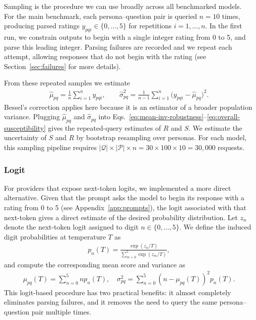 \documentclass{article}
\begin{document}
Sampling is the procedure we can use broadly across all benchmarked models. For the main benchmark, each persona--question pair is queried \(n=10\) times, producing parsed ratings \(y_{pqi}\in\{0,\ldots,5\}\) for repetitions \(i=1,\ldots,n\). In the first run, we constrain outputs to begin with a single integer rating from 0 to 5, and parse this leading integer. Parsing failures are recorded and we repeat each attempt, allowing responses that do not begin with the rating (see Section~\ref{sec:failures} for more details).

From these repeated samples we estimate
\begin{align}
  \hat{\mu}_{pq} = \frac{1}{n} \sum_{i=1}^{n} y_{pqi},\qquad \hat{\sigma}_{pq}^2 = \frac{1}{n-1} \sum_{i=1}^{n} \big(y_{pqi} - \hat{\mu}_{pq}\big)^2.
\end{align}
Bessel's correction applies here because it is an estimator of a broader population variance. Plugging \(\hat{\mu}_{pq}\) and \(\hat{\sigma}_{pq}\) into Eqs.~\eqref{eq:mean-inv-robustness}--\eqref{eq:overall-susceptibility} gives the repeated-query estimates of \(R\) and \(S\). We estimate the uncertainty of \(S\) and \(R\) by bootstrap resampling over personas. For each model, this sampling pipeline requires $|\mathcal{Q}|\times|\mathcal{P}|\times n =30\times 100\times 10=30,000$ requests.

\subsubsection{Logit}
\label{sec:logit}

For providers that expose next-token logits, we implemented a more direct alternative. Given that the prompt asks the model to begin its response with a rating from 0 to 5 (see Appendix~\ref{app:prompts}), the logit associated with that next-token gives a direct estimate of the desired probability distribution. Let \(z_n\) denote the next-token logit assigned to digit \(n\in\{0,\ldots,5\}\). We define the induced digit probabilities at temperature $T$ as
\begin{align}
  p_n(T) = \frac{\exp(z_n/T)}{\sum_{m=0}^5 \exp(z_m/T)},
  \label{eq:probabilities}
\end{align}
and compute the corresponding mean score and variance as
\begin{align}
  \mu_{pq}(T) = \sum_{n=0}^5 n p_n(T), \quad \sigma_{pq}^2 = \sum_{n=0}^5 (n-\mu_{pq}(T))^2 p_n(T).
\end{align}
This logit-based procedure has two practical benefits: it almost completely eliminates parsing failures, and it removes the need to query the same persona--question pair multiple times. 
\end{document}
